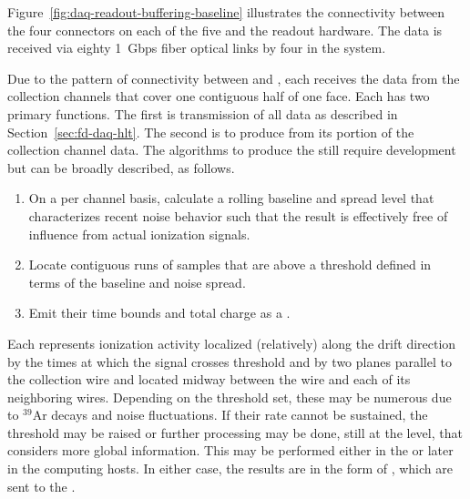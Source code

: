 Figure~\ref{fig:daq-readout-buffering-baseline} illustrates the connectivity between the
four connectors on each of the five  and the  readout hardware.
The data is received via eighty \SI{1}{Gbps} fiber optical links by four 
in the   system. 

Due to the pattern of connectivity between  and , each  receives the data from the collection channels that cover one contiguous half of one  face. 
Each  has two primary functions. 
The first is transmission of all data as described in
Section~\ref{sec:fd-daq-hlt}. 
The second is to produce  from its portion of the
collection channel data.
The algorithms to produce the  still require
development but can be broadly described, as follows.

\begin{enumerate}
\item On a per channel basis, calculate a rolling baseline and spread
  level that characterizes recent noise behavior such that the result
  is effectively free of influence from actual ionization signals.
\item Locate contiguous runs of  samples that are above a threshold
  defined in terms of the baseline and noise spread.
\item Emit their time bounds and total charge as a .
\end{enumerate}

Each  represents ionization activity localized
(relatively) along the drift direction by the times at which the
signal crosses threshold and by two planes parallel to the collection
wire and located midway between the wire and each of its neighboring
wires.
Depending on the threshold set, these  may be
numerous due to $^{39}$Ar decays and noise fluctuations.
If their rate cannot be sustained, the threshold may be raised or
further processing may be done, still at the  level, that %
considers more global information.
This may be performed either in the  or later in the
 computing hosts. 
In either case, the results are in the form of ,
which are sent to the .

